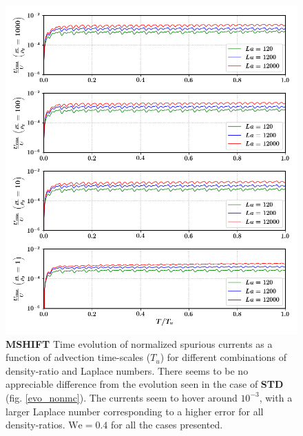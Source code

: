 \begin{figure}[h!]
    \centering
    \includegraphics[]{plots/droplet_advect/evo_daniel.png}
	\caption{\textbf{MSHIFT} Time evolution of normalized spurious currents as a function of advection time-scales ($T_u$) for different combinations of density-ratio and Laplace numbers. There seems to be no appreciable difference from the evolution seen in the case of \textbf{STD} (fig. \ref{evo_nonmc}). The currents seem to hover around $10^{-3}$, with a larger Laplace number corresponding to a higher error for all density-ratios. $\textrm{We} = 0.4$ for all the cases presented.}   
    \label{evo_daniel}
\end{figure}

